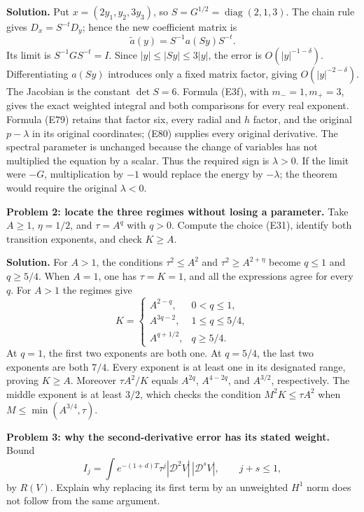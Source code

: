 \documentclass[
  11pt,
]{article}
\begin{document}
\textbf{Solution.} Put \(x=(2y_1,y_2,3y_3)\), so
\(S=G^{1/2}=\operatorname{diag}(2,1,3)\). The chain rule gives
\(D_x=S^{-t}D_y\); hence the new coefficient matrix is \[
              \widetilde a(y)=S^{-1}a(Sy)S^{-t}.
\] Its limit is \(S^{-1}GS^{-t}=I\). Since \(|y|\leq|Sy|\leq3|y|\), the
error is \(O(|y|^{-1-\delta})\). Differentiating \(a(Sy)\) introduces
only a fixed matrix factor, giving \(O(|y|^{-2-\delta})\). The Jacobian
is the constant \(\det S=6\). Formula (E3f), with \(m_-=1,m_+=3\), gives
the exact weighted integral and both comparisons for every real
exponent. Formula (E79) retains that factor six, every radial and \(h\)
factor, and the original \(p-\lambda\) in its original coordinates;
(E80) supplies every original derivative. The spectral parameter is
unchanged because the change of variables has not multiplied the
equation by a scalar. Thus the required sign is \(\lambda>0\). If the
limit were \(-G\), multiplication by \(-1\) would replace the energy by
\(-\lambda\); the theorem would require the original \(\lambda<0\).

\textbf{Problem 2: locate the three regimes without losing a parameter.}
Take \(A\geq1\), \(\eta=1/2\), and \(\tau=A^q\) with \(q>0\). Compute
the choice (E31), identify both transition exponents, and check
\(K\geq A\).

\textbf{Solution.} For \(A>1\), the conditions \(\tau^2\leq A^2\) and
\(\tau^2\geq A^{2+\eta}\) become \(q\leq1\) and \(q\geq5/4\). When
\(A=1\), one has \(\tau=K=1\), and all the expressions agree for every
\(q\). For \(A>1\) the regimes give \[
 K=
 \begin{cases}
 A^{2-q},&0<q\leq1,\\
 A^{3q-2},&1\leq q\leq5/4,\\
 A^{q+1/2},&q\geq5/4.
 \end{cases}
\] At \(q=1\), the first two exponents are both one. At \(q=5/4\), the
last two exponents are both \(7/4\). Every exponent is at least one in
its designated range, proving \(K\geq A\). Moreover \(\tau A^2/K\)
equals \(A^{2q}\), \(A^{4-2q}\), and \(A^{3/2}\), respectively. The
middle exponent is at least \(3/2\), which checks the condition
\(M^2K\leq\tau A^2\) when \(M\leq\min(A^{3/4},\tau)\).

\textbf{Problem 3: why the second-derivative error has its stated
weight.} Bound \[
 I_j=\int e^{-(1+d)T}\tau^j|\mathcal D^2V|\,|\mathcal D^sV|,
          \qquad j+s\leq1,
\] by \(R(V)\). Explain why replacing its first term by an unweighted
\(H^1\) norm does not follow from the same argument.
\end{document}
